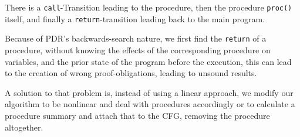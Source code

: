 \documentclass[11pt, a4paper, BCOR=10mm, ngerman]{scrbook}
\begin{document}
There is a \texttt{call}-Transition leading to the procedure, then the procedure \texttt{proc()} itself, and finally a \texttt{return}-transition leading back to the main program. \par
Because of PDR's backwards-search nature, we first find the \texttt{return} of a procedure, without knowing the effects of the corresponding procedure on variables, and the prior state of the program before the execution, this can lead to the creation of wrong proof-obligations, leading to unsound results. \par

A solution to that problem is, instead of using a linear approach, we modify our algorithm to be nonlinear and deal with procedures accordingly \cite{DBLP:conf/sat/HoderB12} or to calculate a procedure summary and attach that to the CFG, removing the procedure altogether.
%

%
%
\end{document}
